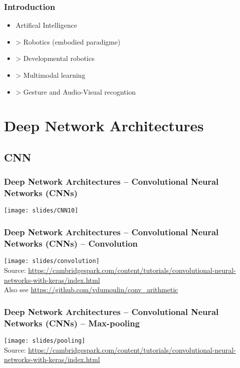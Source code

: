 \begin{frame}
  \frametitle{Introduction}
  \begin{itemize}[<+->]
    \item Artifical Intelligence
    \item > Robotics (embodied paradigme)
    \item > Developmental robotics
    \item > Multimodal learning
    \item > Gesture and Audio-Visual recogntion
  \end{itemize}
\end{frame}

\section{Deep Network Architectures}

\subsection{CNN}

\begin{frame}
  \frametitle{Deep Network Architectures -- Convolutional
    Neural Networks (CNNs)}
  \texttt{[image: slides/CNN10]}
\end{frame}

\begin{frame}
\frametitle{Deep Network Architectures -- Convolutional
  Neural Networks (CNNs) -- Convolution}
  \vspace*{1.2em}
  \centering
  \texttt{[image: slides/convolution]}\\
  \vspace*{-0.4em}
  \flushleft
  Source: 
    \href{https://cambridgespark.com/content/tutorials/convolutional-neural-networks-with-keras/index.html}
    {https://cambridgespark.com/content/tutorials/convolutional-neural-networks-with-keras/index.html}\\
  Also see \href{https://github.com/vdumoulin/conv\_arithmetic}
    {https://github.com/vdumoulin/conv\_arithmetic}
\end{frame}

\begin{frame}
\frametitle{Deep Network Architectures -- Convolutional
  Neural Networks (CNNs) -- Max-pooling}
  \vspace*{0.6em}
  \centering
  \texttt{[image: slides/pooling]}\\
  \vspace*{0.6em}
  \flushleft
  Source: 
    \href{https://cambridgespark.com/content/tutorials/convolutional-neural-networks-with-keras/index.html}
    {https://cambridgespark.com/content/tutorials/convolutional-neural-networks-with-keras/index.html}\\
\end{frame}

